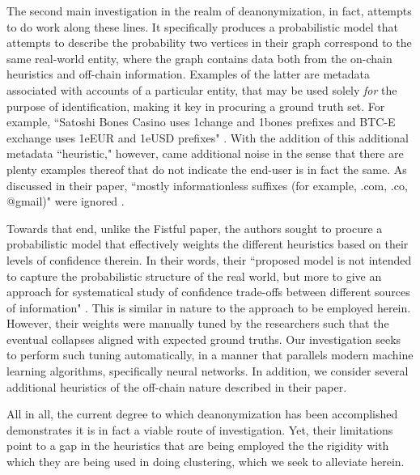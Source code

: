 \documentclass{article}
\begin{document}
The second main investigation in the realm of deanonymization, in fact, attempts to do work along these lines. It specifically produces a probabilistic model that attempts to describe the probability two vertices in their graph correspond to the same real-world entity, where the graph contains data both from the on-chain heuristics and off-chain information. Examples of the latter are metadata associated with accounts of a particular entity, that may be used solely \textit{for} the purpose of identification, making it key in procuring a ground truth set. For example, ``Satoshi Bones Casino uses 1change and 1bones prefixes and BTC-E exchange uses 1eEUR and 1eUSD prefixes" \cite{automatic}. With the addition of this additional metadata ``heuristic," however, came additional noise in the sense that there are plenty examples thereof that do not indicate the end-user is in fact the same. As discussed in their paper, ``mostly informationless suffixes  (for example, .com, .co, @gmail)" were ignored \cite{automatic}. 

Towards that end, unlike the Fistful paper, the authors sought to procure a probabilistic model that effectively weights the different heuristics based on their levels of confidence therein. In their words, their ``proposed  model  is  not  intended  to  capture the probabilistic structure of the real world, but more to give an  approach  for  systematical  study  of  confidence  trade-offs between different sources of information" \cite{automatic}. This is similar in nature to the approach to be employed herein. However, their weights were manually tuned by the researchers such that the eventual collapses aligned with expected ground truths. Our investigation seeks to perform such tuning automatically, in a manner that parallels modern machine learning algorithms, specifically neural networks. In addition, we consider several additional heuristics of the off-chain nature described in their paper.

All in all, the current degree to which deanonymization has been accomplished demonstrates it is in fact a viable route of investigation. Yet, their limitations point to a gap in the heuristics that are being employed the the rigidity with which they are being used in doing clustering, which we seek to alleviate herein.
\end{document}

